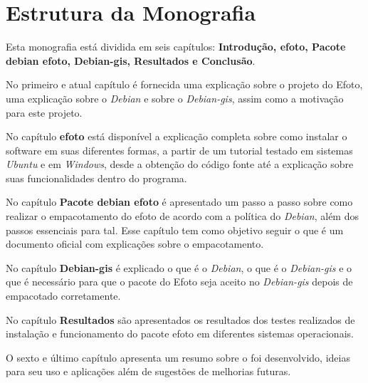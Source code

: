 \section*{Estrutura da Monografia}

Esta monografia está dividida em seis capítulos: \textbf{Introdução, efoto, Pacote debian efoto, Debian-gis, Resultados e Conclusão}.

No primeiro e atual capítulo é fornecida uma explicação sobre o projeto do Efoto, uma explicação sobre o \textit{Debian} e sobre o \textit{Debian-gis}, assim como a motivação para este projeto.

No capítulo \textbf{efoto} está disponível a explicação completa sobre como instalar o software em suas diferentes formas, a partir de um tutorial testado em sistemas \textit{Ubuntu} e em \textit{Windows}, desde a obtenção do código fonte até a explicação sobre suas funcionalidades dentro do programa.

No capítulo \textbf{Pacote debian efoto} é apresentado um passo a passo sobre como realizar o empacotamento do efoto de acordo com a política do \textit{Debian}, além  dos passos essenciais para tal. Esse capítulo tem como objetivo seguir o  que é um documento oficial com explicações sobre o empacotamento.

No capítulo \textbf{Debian-gis} é explicado o que é o \textit{Debian}, o que é o \textit{Debian-gis} e o que é necessário para que o pacote do Efoto seja aceito no \textit{Debian-gis} depois de empacotado corretamente.

No capítulo \textbf{Resultados} são apresentados os resultados dos testes realizados de instalação e funcionamento do pacote efoto em diferentes sistemas operacionais.

O sexto e último capítulo apresenta um resumo sobre o foi desenvolvido, ideias para seu uso e aplicações além de sugestões de melhorias futuras.

